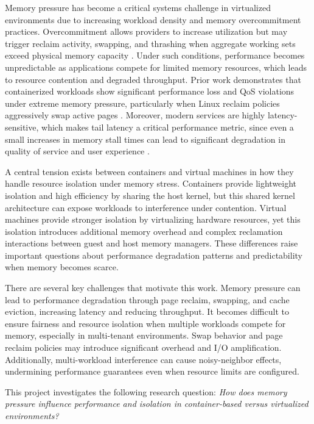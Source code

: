 \documentclass[conference]{IEEEtran}
\begin{document}
Memory pressure has become a critical systems challenge in virtualized environments due to increasing workload density and memory overcommitment practices. Overcommitment allows providers to increase utilization but may trigger reclaim activity, swapping, and thrashing when aggregate working sets exceed physical memory capacity \cite{nakazawa2017taming}. Under such conditions, performance becomes unpredictable as applications compete for limited memory resources, which leads to resource contention and degraded throughput. Prior work demonstrates that containerized workloads show significant performance loss and QoS violations under extreme memory pressure, particularly when Linux reclaim policies aggressively swap active pages \cite{nakazawa2017taming}. Moreover, modern services are highly latency-sensitive, which makes tail latency a critical performance metric, since even a small increases in memory stall times can lead to significant degradation in quality of service and user experience \cite{dean2013tail}. 

A central tension exists between containers and virtual machines in how they handle resource isolation under memory stress. Containers provide lightweight isolation and high efficiency by sharing the host kernel, but this shared kernel architecture can expose workloads to interference under contention. Virtual machines provide stronger isolation by virtualizing hardware resources, yet this isolation introduces additional memory overhead and complex reclamation interactions between guest and host memory managers. These differences raise important questions about performance degradation patterns and predictability when memory becomes scarce.

There are several key challenges that motivate this work. Memory pressure can lead to performance degradation through page reclaim, swapping, and cache eviction, increasing latency and reducing throughput. It becomes difficult to ensure fairness and resource isolation when multiple workloads compete for memory, especially in multi-tenant environments. Swap behavior and page reclaim policies may introduce significant overhead and I/O amplification. Additionally, multi-workload interference can cause noisy-neighbor effects, undermining performance guarantees even when resource limits are configured.

This project investigates the following research question: \textit{How does memory pressure influence performance and isolation in container-based versus virtualized environments?}
\end{document}
